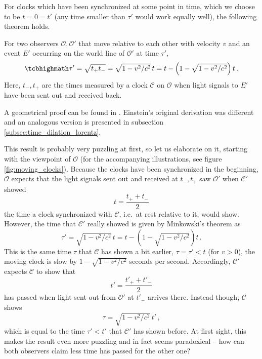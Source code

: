 For clocks which have been synchronized at some point in time, which we choose to be $t = 0 = t'$ (any time smaller than $\tau'$ would work equally well), the following theorem holds.
\begin{thm}\label{thm:minkowski_moving_clocks}
	For two observers $\mathcal{O}, \mathcal{O}'$ that move relative to each other with velocity $v$ and an event $E'$ occurring on the world line of $\mathcal{O}'$ at time $\tau'$,
	\begin{equation}\label{eq:minkowski_theorem}
		\eqbox{
		\tau' = \sqrt{t_+ t_-} = \sqrt{1 - v^2 / c^2} \, t = t - \qty(1 - \sqrt{1 - v^2 / c^2}) \, t
		} \, .
	\end{equation}
	Here, $t_-, t_+$ are the times measured by a clock $\mathcal{C}$ on $\mathcal{O}$ when light signals to $E'$ have been sent out and received back.
\end{thm}
A geometrical proof can be found in \cite{dragon_geometry_srt}. Einstein's original derivation was different and an analogous version is presented in subsection \ref{subsec:time_dilation_lorentz}.



This result is probably very puzzling at first, so let us elaborate on it, starting with the viewpoint of $\mathcal{O}$ (for the accompanying illustrations, see figure \ref{fig:moving_clocks}). Because the clocks have been synchronized in the beginning, $\mathcal{O}$ expects that the light signals sent out and received at $t_-, t_+$ saw $\mathcal{O}'$ when $\mathcal{C}'$ showed
\begin{equation*}
	t = \frac{t_+ + t_-}{2}
\end{equation*}
the time a clock synchronized with $\mathcal{C}$, i.e.~at rest relative to it, would show. However, the time that $\mathcal{C}'$ really showed is given by Minkowski's theorem as
\begin{equation*}
	\tau' = \sqrt{1 - v^2 / c^2} \, t = t - (1 - \sqrt{1 - v^2 / c^2}) t \, .
\end{equation*}
This is the same time $\tau$ that $\mathcal{C}$ has shown a bit earlier, $\tau = \tau' < t$ (for $v > 0$), the moving clock is slow by $1 - \sqrt{1 - v^2 / c^2}$ seconds per second. Accordingly, $\mathcal{C}'$ expects $\mathcal{C}$ to show that
\begin{equation*}
	t' = \frac{t'_+ + t'_-}{2}
\end{equation*}
has passed when light sent out from $\mathcal{O}'$ at $t'_-$ arrives there. Instead though, $\mathcal{C}$ shows
\begin{equation*}
	\tau = \sqrt{1 - v^2 / c^2} \, t' \, ,
\end{equation*}
which is equal to the time $\tau' < t'$ that $\mathcal{C}'$ has shown before. At first sight, this makes the result even more puzzling and in fact seems paradoxical -- how can both observers claim less time has passed for the other one?


